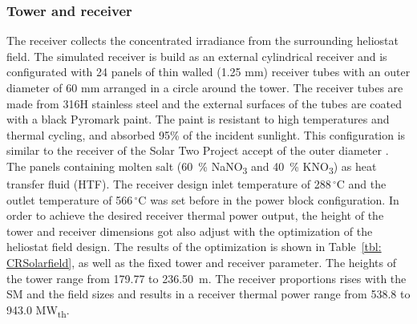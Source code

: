 \subsubsection{Tower and receiver}
The receiver collects the concentrated irradiance from the surrounding heliostat field. The simulated receiver is build as an external cylindrical receiver and is configurated with 24 panels of thin walled (1.25 mm) receiver tubes with an outer diameter of 60 mm arranged in a circle around the tower. The receiver tubes are made from 316H stainless steel and the external surfaces of the tubes are coated with a black Pyromark paint. The paint is resistant to high temperatures and thermal cycling, and absorbed 95\% of the incident sunlight. This configuration is similar to the receiver of the  Solar Two Project accept of the outer diameter \cite{Bradshaw2002}. The panels containing molten salt (60~\% NaNO\textsubscript{3} and 40~\% KNO\textsubscript{3}) as heat transfer fluid (HTF). The receiver design inlet temperature of 288$\,^{\circ}\mathrm{C}$ and the outlet temperature of 566$\,^{\circ}\mathrm{C}$ was set before in the power block configuration. In order to achieve the desired receiver thermal power output, the height of the tower and receiver dimensions got also adjust with the optimization of the heliostat field design. The results of the optimization is shown in Table~\ref{tbl: CRSolarfield}, as well as the fixed tower and receiver parameter. The heights of the tower range from 179.77 to 236.50~m. The receiver proportions rises with the SM and the field sizes and results in a receiver thermal power range from 538.8 to 943.0 MW\textsubscript{th}.
